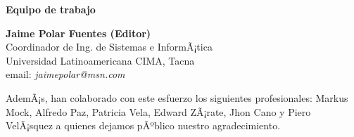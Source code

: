 \begin{center}
{\bf \Huge Equipo de trabajo}
\end{center}
\vspace{1cm}

\begin{center}
\textbf{Jaime Polar Fuentes (Editor)}\\
Coordinador de Ing. de Sistemas e InformÃ¡tica \\
Universidad Latinoamericana CIMA, Tacna\\
email: \textit{jaimepolar@msn.com}\\
\end{center}



AdemÃ¡s, han colaborado con este esfuerzo los siguientes profesionales: Markus Mock, Alfredo Paz, Patricia Vela, Edward ZÃ¡rate, Jhon Cano y Piero VelÃ¡squez a quienes dejamos pÃºblico nuestro agradecimiento.
